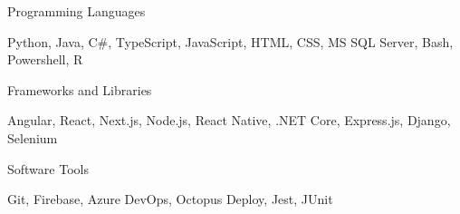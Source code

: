 



\begin{cvskills}    
      
      
\cvskill
    {Programming Languages}
    {\begin{minipage}[t]{0.7\textwidth}
       Python, Java, C\#, TypeScript, JavaScript, HTML, CSS, MS SQL Server, Bash, Powershell, R
    \end{minipage}
    }
    
\cvskill
    {Frameworks and Libraries}
    {\begin{minipage}[t]{0.7\textwidth}
       Angular, React, Next.js, Node.js, React Native, .NET Core, Express.js, Django, Selenium
    \end{minipage}
    }
    

\cvskill
    {Software Tools}
    {\begin{minipage}[t]{0.7\textwidth}
       Git, Firebase, Azure DevOps, Octopus Deploy, Jest, JUnit
    \end{minipage}
    }

    
\end{cvskills}  

